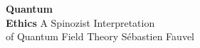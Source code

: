 \thispagestyle{empty}

\null
\vfill
\begin{center}
{\Huge \textbf{Quantum\\Ethics}}
\vskip 1.2cm
A Spinozist Interpretation\\
of Quantum Field Theory
\vskip 2cm
{\large Sébastien Fauvel}
\end{center}
\vfill
\null
